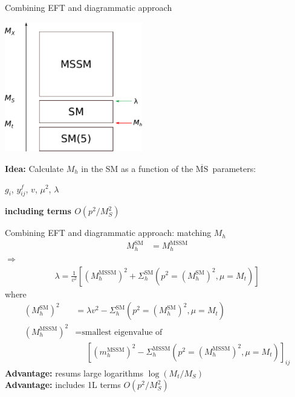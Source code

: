 \documentclass[hyperref={pdfpagelabels=false},ngerman]{beamer}
\renewcommand{\emph}{\textbf}
\newcommand{\MSbar}{\ensuremath{\overline{\text{MS}}}}
\newcommand{\SM}{\ensuremath{\text{SM}}}
\begin{document}

\begin{frame}{Combining EFT and diagrammatic approach}
  \begin{center}
    \includegraphics[width=0.45\textwidth]{images/mssm-sm-tower-eft}\\[1em]
  \end{center}
  \emph{Idea:} Calculate $M_h$ in the SM as a function of the \MSbar\ parameters:\\[1em]
  \begin{center}
    $g_i$, $y^f_{ij}$, $v$, $\mu^2$, $\lambda$
  \end{center}
  \emph{including terms $O(p^2/M_S^2)$}
\end{frame}

\begin{frame}{Combining EFT and diagrammatic approach: matching $M_h$}
  \begin{align*}
    M_h^{\SM} &= M_h^\text{MSSM}
  \end{align*}
  $\Rightarrow$
  \begin{align*}
    \lambda = \frac{1}{v^2} \left[ (M_h^\text{MSSM})^2 +
      \Sigma^\SM_h(p^2 = (M_h^\SM)^2,\mu = M_t) \right]
  \end{align*}
  where
  \begin{align*}
    (M_h^{\SM})^2 &= \lambda v^2 - \Sigma^{\SM}_h(p^2 = (M_h^{\SM})^2,\mu = M_t) \\
    (M_h^\text{MSSM})^2 &= \text{smallest eigenvalue of} \\
    &\phantom{={}} \left[(m_h^\text{MSSM})^2 - \Sigma^\text{MSSM}_h(p^2 = (M_h^\text{MSSM})^2,\mu = M_t)\right]_{ij}
  \end{align*}
  \emph{Advantage:} resums large logarithms $\log(M_t/M_S)$\\
  \emph{Advantage:} includes 1L terms $O(p^2/M_S^2)$
\end{frame}

\end{document}

